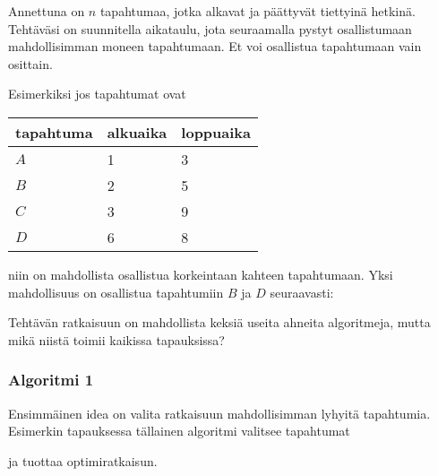 \begin{task}
Annettuna on $n$ tapahtumaa,
jotka alkavat ja päättyvät tiettyinä hetkinä.
Tehtäväsi on suunnitella aikataulu,
jota seuraamalla pystyt osallistumaan
mahdollisimman moneen tapahtumaan.
Et voi osallistua tapahtumaan vain osittain.
\end{task}

Esimerkiksi jos tapahtumat ovat

\begin{center}
\begin{tabular}{lll}
tapahtuma & alkuaika & loppuaika \\
\hline
$A$ & 1 & 3 \\
$B$ & 2 & 5 \\
$C$ & 3 & 9 \\
$D$ & 6 & 8 \\
\end{tabular}
\end{center}

\noindent
niin on mahdollista osallistua korkeintaan
kahteen tapahtumaan.
Yksi mahdollisuus on osallistua tapahtumiin
$B$ ja $D$ seuraavasti:
\\
\begin{center}
\end{center}

\noindent
Tehtävän ratkaisuun on mahdollista 
keksiä useita ahneita algoritmeja,
mutta mikä niistä toimii kaikissa tapauksissa?

\subsubsection*{Algoritmi 1}

Ensimmäinen idea on valita ratkaisuun
mahdollisimman lyhyitä tapahtumia.
Esimerkin tapauksessa tällainen
algoritmi valitsee tapahtumat
\\
\begin{center}
\end{center}
ja tuottaa optimiratkaisun.

